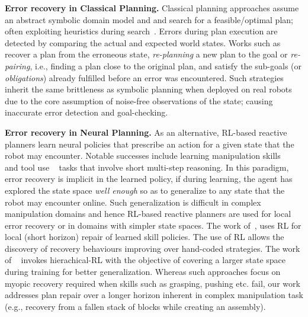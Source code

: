 \textbf{Error recovery in Classical Planning. }
Classical planning approaches assume an abstract symbolic domain model and and search for a feasible/optimal plan; often exploiting heuristics during  search~\citep{belta2007symbolic}.     
%
Errors during plan execution are detected by comparing the actual and expected world states. Works such as ~\citep{bercher2014plan,saetti2022optimising,fox2006plan} recover a plan from the erroneous state, \emph{re-planning} a new plan to the goal or \emph{re-pairing}, i.e., finding a plan close to the original plan, and satisfy the sub-goals (or \emph{obligations}) already fulfilled before an error was encountered.  
%
Such strategies inherit the same brittleness as symbolic planning when deployed on real robots due to the core assumption of noise-free observations of the state; causing inaccurate error detection and goal-checking. 

\textbf{Error recovery in Neural Planning. }
%
As an alternative, RL-based reactive planners learn neural policies that prescribe an action for a given state that the robot may encounter.   
%
Notable successes include learning manipulation skills ~\citep{rana2023residual,kumar2023graph,ebert2018visual} and tool use ~\citep{li2020towards,wu2019imagine} tasks that involve short multi-step reasoning. 
%
In this paradigm, error recovery is implicit in the learned policy, if during learning, the agent has explored the state space \emph{well enough} so as to  generalize to any state that the robot may encounter online. 
%
Such generalization is difficult in complex manipulation domains and hence RL-based reactive planners are used for local error recovery or in domains with simpler state spaces. 
%
The work of~\citep{ryu2022confidence,vatsefficient,thananjeyan2021recovery}, uses RL for local (short horizon) repair of learned skill policies. The use of RL allows the discovery of recovery behaviours improving over hand-coded strategies. The work of ~\citep{bagaria2020option} invokes hierachical-RL with the objective of covering a larger state space during training for better generalization.   
%
Whereas such approaches focus on myopic recovery required when skills such as grasping, pushing etc. fail, our work addresses plan repair over a longer horizon inherent in complex manipulation task (e.g., recovery from a fallen stack of blocks while creating an assembly). 

